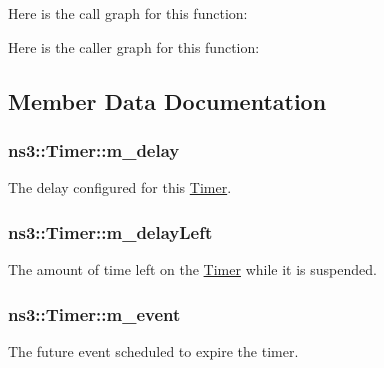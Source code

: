 Here is the call graph for this function\+:




Here is the caller graph for this function\+:




\subsection{Member Data Documentation}
\subsubsection[{\texorpdfstring{m\+\_\+delay}{m_delay}}]{ ns3\+::\+Timer\+::m\+\_\+delay\hspace{0.3cm}{\ttfamily [private]}}\hypertarget{classns3_1_1Timer_ad116dff0fe3cb03e8b81bded08745ba8}{}\label{classns3_1_1Timer_ad116dff0fe3cb03e8b81bded08745ba8}
The delay configured for this \hyperlink{classns3_1_1Timer}{Timer}. 
\subsubsection[{\texorpdfstring{m\+\_\+delay\+Left}{m_delayLeft}}]{ ns3\+::\+Timer\+::m\+\_\+delay\+Left\hspace{0.3cm}{\ttfamily [private]}}\hypertarget{classns3_1_1Timer_aec500b5e030558033908ec99695e1630}{}\label{classns3_1_1Timer_aec500b5e030558033908ec99695e1630}
The amount of time left on the \hyperlink{classns3_1_1Timer}{Timer} while it is suspended. 
\subsubsection[{\texorpdfstring{m\+\_\+event}{m_event}}]{ ns3\+::\+Timer\+::m\+\_\+event\hspace{0.3cm}{\ttfamily [private]}}\hypertarget{classns3_1_1Timer_a53f4b3ad509801685a817d49f0e002fe}{}\label{classns3_1_1Timer_a53f4b3ad509801685a817d49f0e002fe}
The future event scheduled to expire the timer. 
